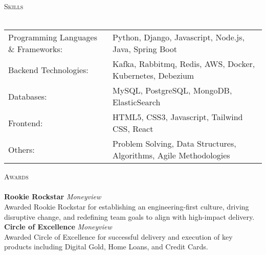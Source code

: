 \documentclass[10pt,a4paper]{article}
\newcommand{\lineunder} {
    \vspace*{-8pt} \\
    \hspace*{-18pt} \hrulefill \\
}
\newcommand{\header} [1] {
    {\hspace*{-18pt}\vspace*{6pt} \textsc{#1}}
    \vspace*{-6pt} \lineunder
}
\begin{document}
\header{Skills}
\begin{tabular}{ l l }
	Programming Languages \& Frameworks: & Python, Django, Javascript, Node.js, Java, Spring Boot            \\
	Backend Technologies:                & Kafka, Rabbitmq, Redis, AWS, Docker, Kubernetes, Debezium         \\
	Databases:                           & MySQL, PostgreSQL, MongoDB, ElasticSearch                         \\
	Frontend:                            & HTML5, CSS3, Javascript, Tailwind CSS, React                      \\
	Others:                              & Problem Solving, Data Structures, Algorithms, Agile Methodologies \\
\end{tabular}
\vspace{2mm}

\header{Awards}
{\textbf{Rookie Rockstar}} {\sl Moneyview} \\
Awarded \textquotesingle{}Rookie Rockstar\textquotesingle{} for establishing an engineering-first culture, driving disruptive change, and redefining team goals to align with high-impact delivery.\\
\vspace*{2mm}
{\textbf{Circle of Excellence}} {\sl Moneyview} \\
Awarded \textquotesingle{}Circle of Excellence\textquotesingle{} for successful delivery and execution of key products including Digital Gold, Home Loans, and Credit Cards.\\
\vspace*{2mm}

\ 
\end{document}
